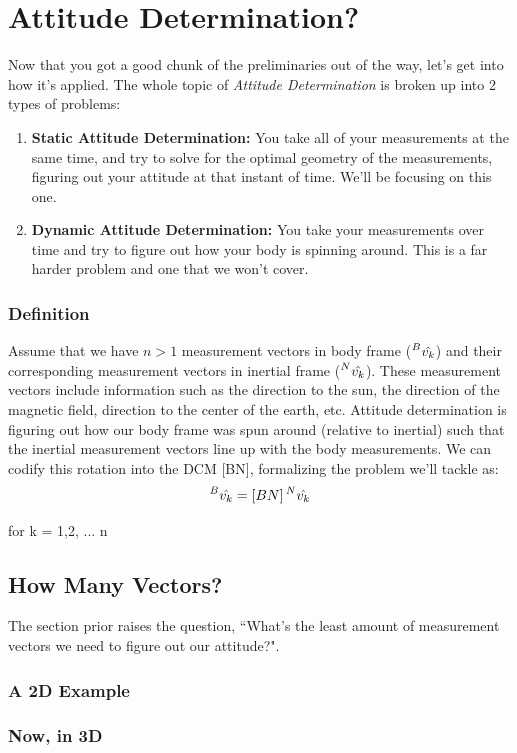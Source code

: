 \documentclass[a4paper,14pt]{extreport}
\newcommand{\vk}[1]{\prescript{#1}{}{\hat{v_k}}}
\begin{document}
\chapter{Attitude Determination?}
Now that you got a good chunk of the preliminaries out of the way, let's get into how it's applied. The whole topic of \emph{Attitude Determination} is broken up into 2 types of problems:
\begin{enumerate}
\item{
\textbf{Static Attitude Determination:} You take all of your measurements at the same time, and try to solve for the optimal geometry of the measurements, figuring out your attitude at that instant of time. We'll be focusing on this one.
}
\item{\textbf{Dynamic Attitude Determination:} You take your measurements over time and try to figure out how your body is spinning around. This is a far harder problem and one that we won't cover.
}
\end{enumerate}
\subsection{Definition}
Assume that we have $n>1$ measurement vectors in body frame ($\vk{B}$) and their corresponding measurement vectors in inertial frame ($\vk{N}$). These measurement vectors include information such as the direction to the sun, the direction of the magnetic field, direction to the center of the earth, etc. Attitude determination is figuring out how our body frame was spun around (relative to inertial) such that the inertial measurement vectors line up with the body measurements. We can codify this rotation into the DCM [BN], formalizing the problem we'll tackle as:
\[
\vk{B}= [BN]\vk{N}
\]
\begin{center}
for k = 1,2, ... n
\end{center}
\section{How Many Vectors?}
The section prior raises the question, ``What's the least amount of measurement vectors we need to figure out our attitude?".
\subsection{A 2D Example}

\subsection{Now, in 3D}
\end{document}

